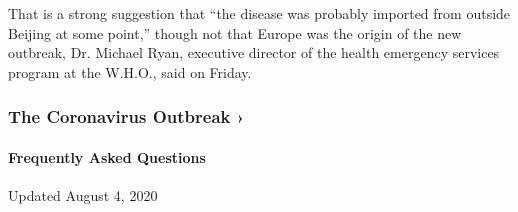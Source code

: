 That is a strong suggestion that ``the disease was probably imported
from outside Beijing at some point,'' though not that Europe was the
origin of the new outbreak, Dr. Michael Ryan, executive director of the
health emergency services program at the W.H.O., said on Friday.

\href{https://www.nytimes.com/news-event/coronavirus?action=click\&pgtype=Article\&state=default\&region=MAIN_CONTENT_3\&context=storylines_faq}{}

\hypertarget{the-coronavirus-outbreak-}{%
\subsubsection{The Coronavirus Outbreak
›}\label{the-coronavirus-outbreak-}}

\hypertarget{frequently-asked-questions}{%
\paragraph{Frequently Asked
Questions}\label{frequently-asked-questions}}

Updated August 4, 2020

